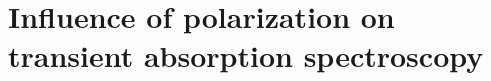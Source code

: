 \section[Polarization effects]{Influence of polarization on transient absorption spectroscopy}
\label{sec:TheoPolarization}



